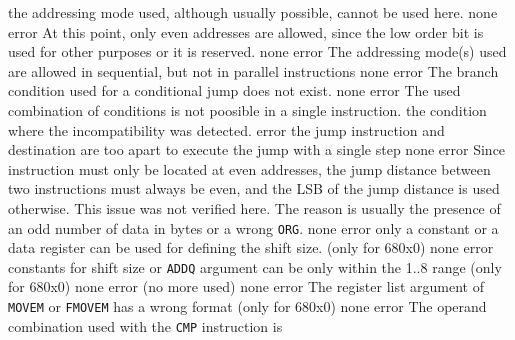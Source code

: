 \documentclass[12pt,twoside]{report}
\newcommand{\tty}[1]{{\tt #1}}
\begin{document}
\begin{description}
               {the addressing mode used, although usually possible,
                cannot be used here.}
               {none}
               {error}
               {At this point, only even addresses are allowed, since the
                low order bit is used for other purposes or it is reserved.}
               {none}
               {error}
               {The addressing mode(s) used are allowed in sequential,
                but not in parallel instructions}
               {none}
               {error}
               {The branch condition used for a conditional jump does not
                exist.}
               {none}
               {error}
               {The used combination of conditions is not poosible
                in a single instruction.}
               {the condition where the incompatibility was detected.}
               {error}
               {the jump instruction and destination are too apart to
                execute the jump with a single step}
               {none}
               {error}
               {Since instruction must only be located at even addresses,
                the jump distance between two instructions must always be
                even, and the LSB of the jump distance is used otherwise.
                This issue was not verified here. The reason is usually the
                presence of an odd number of data in bytes or a wrong
                \tty{ORG}.}
               {none}
               {error}
               {only a constant or a data register can be used for defining
                the shift size. (only for 680x0)}
               {none}
               {error}
               {constants for shift size or \tty{ADDQ} argument can be only
                within the 1..8 range (only for 680x0)}
               {none}
               {error}
               {(no more used)}
               {none}
               {error}
               {The register list argument of \tty{MOVEM} or \tty{FMOVEM} has a
                wrong format (only for 680x0)}
               {none}
               {error}
               {The operand combination used with the \tty{CMP} instruction is
}
\end{description}
\end{document}
